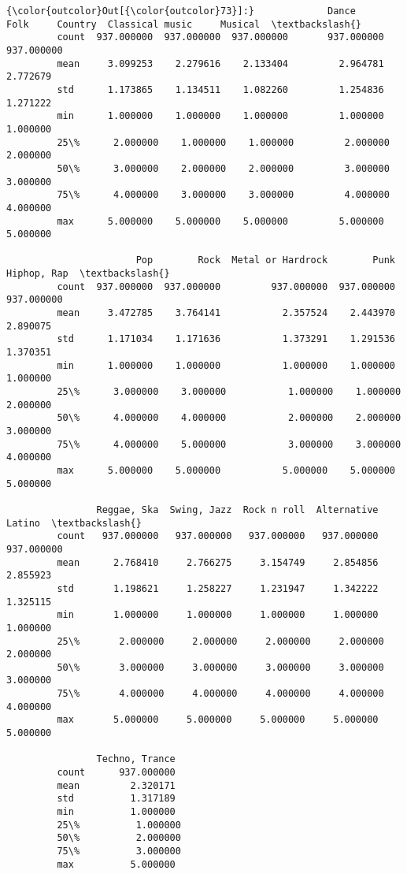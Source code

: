 \documentclass[11pt]{article}
\begin{document}
\begin{Verbatim}[commandchars=\\\{\}]
{\color{outcolor}Out[{\color{outcolor}73}]:}             Dance        Folk     Country  Classical music     Musical  \textbackslash{}
         count  937.000000  937.000000  937.000000       937.000000  937.000000   
         mean     3.099253    2.279616    2.133404         2.964781    2.772679   
         std      1.173865    1.134511    1.082260         1.254836    1.271222   
         min      1.000000    1.000000    1.000000         1.000000    1.000000   
         25\%      2.000000    1.000000    1.000000         2.000000    2.000000   
         50\%      3.000000    2.000000    2.000000         3.000000    3.000000   
         75\%      4.000000    3.000000    3.000000         4.000000    4.000000   
         max      5.000000    5.000000    5.000000         5.000000    5.000000   
         
                       Pop        Rock  Metal or Hardrock        Punk  Hiphop, Rap  \textbackslash{}
         count  937.000000  937.000000         937.000000  937.000000   937.000000   
         mean     3.472785    3.764141           2.357524    2.443970     2.890075   
         std      1.171034    1.171636           1.373291    1.291536     1.370351   
         min      1.000000    1.000000           1.000000    1.000000     1.000000   
         25\%      3.000000    3.000000           1.000000    1.000000     2.000000   
         50\%      4.000000    4.000000           2.000000    2.000000     3.000000   
         75\%      4.000000    5.000000           3.000000    3.000000     4.000000   
         max      5.000000    5.000000           5.000000    5.000000     5.000000   
         
                Reggae, Ska  Swing, Jazz  Rock n roll  Alternative      Latino  \textbackslash{}
         count   937.000000   937.000000   937.000000   937.000000  937.000000   
         mean      2.768410     2.766275     3.154749     2.854856    2.855923   
         std       1.198621     1.258227     1.231947     1.342222    1.325115   
         min       1.000000     1.000000     1.000000     1.000000    1.000000   
         25\%       2.000000     2.000000     2.000000     2.000000    2.000000   
         50\%       3.000000     3.000000     3.000000     3.000000    3.000000   
         75\%       4.000000     4.000000     4.000000     4.000000    4.000000   
         max       5.000000     5.000000     5.000000     5.000000    5.000000   
         
                Techno, Trance  
         count      937.000000  
         mean         2.320171  
         std          1.317189  
         min          1.000000  
         25\%          1.000000  
         50\%          2.000000  
         75\%          3.000000  
         max          5.000000  
\end{Verbatim}
            
\end{document}
